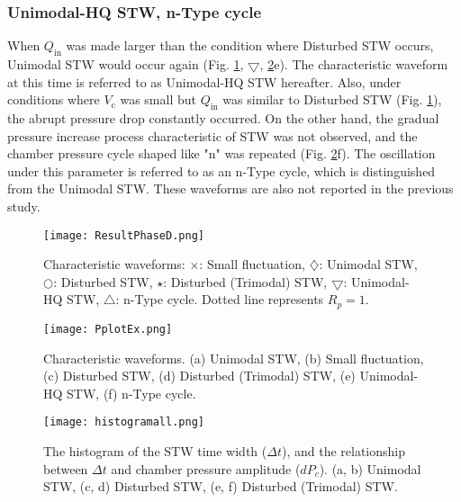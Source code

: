 \documentclass[aps,pre,preprint,groupedaddress,showkeys]{revtex4-2}
\begin{document}
\subsubsection{Unimodal-HQ STW, n-Type cycle}
When $Q_ \mathrm{in}$ was made larger than the condition where Disturbed STW occurs, Unimodal STW would occur again (Fig. \ref{ResultPhaseD}, $\bigtriangledown$, \ref{PplotEx}e).
The characteristic waveform at this time is referred to as Unimodal-HQ STW hereafter.
Also, under conditions where $ V_ \mathrm{c} $ was small but $ Q_\mathrm{in} $ was similar to Disturbed STW (Fig. \ref{ResultPhaseD}), the abrupt pressure drop constantly occurred.
On the other hand, the gradual pressure increase process characteristic of STW was not observed, and the chamber pressure cycle shaped like "n" was repeated (Fig. \ref{PplotEx}f).
The oscillation under this parameter is referred to as an n-Type cycle, which is distinguished from the Unimodal STW.
These waveforms are also not reported in the previous study.

\begin{figure}
\texttt{[image: ResultPhaseD.png]} 
\caption{\label{ResultPhaseD} Characteristic waveforms: $\times$: Small fluctuation, $\diamondsuit$: Unimodal STW, $\bigcirc$: Disturbed STW, $\star$: Disturbed (Trimodal) STW,  $\bigtriangledown$: Unimodal-HQ STW, $\bigtriangleup$: n-Type cycle. Dotted line represents $R_p = 1$.}
\end{figure} 

\begin{figure}
\texttt{[image: PplotEx.png]} 
\caption{\label{PplotEx}Characteristic waveforms. (a) Unimodal STW, (b) Small fluctuation, (c) Disturbed STW, (d) Disturbed (Trimodal) STW, (e) Unimodal-HQ STW, (f) n-Type cycle.}
\end{figure} 

\begin{figure}
\texttt{[image: histogramall.png]} 
\caption{\label{histogramall}The histogram of the STW time width ($\Delta t$), and the relationship between $\Delta t$ and chamber pressure amplitude ($dP_c$). (a, b) Unimodal STW, (c, d) Disturbed STW, (e, f) Disturbed (Trimodal) STW.}
\end{figure} 
\end{document}
